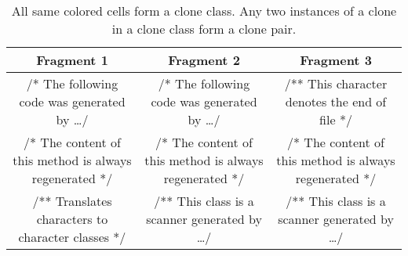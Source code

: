 \setlength{\extrarowheight}{.5em}
\begin{table}
	\caption[Clone pair and clone class.]{All same colored cells form a clone class. Any two instances of a clone in a clone class form a clone pair.}
	\label{table:cloneClass}

%		
%		
	\begin{tabularx}{1.0\textwidth}{C|C|C}
		\textbf{Fragment 1} & \textbf{Fragment 2} & \textbf{Fragment 3} \\
		\hline
		
		/* The following code was generated by \dots */ &
		/* The following code was generated by \dots */ &
		/** This character denotes the end of file */ \\
		\hline
				
		/* The content of this method is always regenerated */ &
		/* The content of this method is always regenerated */ &
		/* The content of this method is always regenerated */ \\
		\hline
		
		/** Translates characters to character classes */ &
		 /** This class is a scanner generated by \dots */ &
		 /** This class is a scanner generated by \dots */ \\
	\end{tabularx}
\end{table}